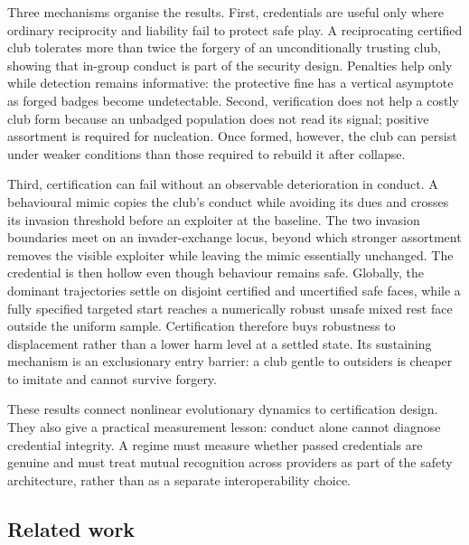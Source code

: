 \documentclass[a4paper,fleqn,longmktitle]{cas-sc}
\theoremstyle{plain}
\theoremstyle{definition}
\begin{document}
Three mechanisms organise the results. First, credentials are useful only
where ordinary reciprocity and liability fail to protect safe play. A
reciprocating certified club tolerates more than twice the forgery of an
unconditionally trusting club, showing that in-group conduct is part of the
security design. Penalties help only while detection remains informative: the
protective fine has a vertical asymptote as forged badges become
undetectable. Second, verification does not help a costly club form because an
unbadged population does not read its signal; positive assortment is required
for nucleation. Once formed, however, the club can persist under weaker
conditions than those required to rebuild it after collapse.

Third, certification can fail without an observable deterioration in conduct.
A behavioural mimic copies the club's conduct while avoiding its dues and
crosses its invasion threshold before an exploiter at the baseline. The two
invasion boundaries meet on an invader-exchange locus, beyond which stronger
assortment removes the visible exploiter while leaving the mimic essentially
unchanged. The credential is then hollow even though behaviour remains safe.
Globally, the dominant trajectories settle on disjoint certified and
uncertified safe faces, while a fully specified targeted start reaches a
numerically robust unsafe mixed rest face outside the uniform sample. Certification
therefore buys robustness to displacement rather than a lower harm level at a
settled state. Its sustaining mechanism is an exclusionary entry barrier: a
club gentle to outsiders is cheaper to imitate and cannot survive forgery.

These results connect nonlinear evolutionary dynamics to certification design.
They also give a practical measurement lesson: conduct alone cannot diagnose
credential integrity. A regime must measure whether passed credentials are
genuine and must treat mutual recognition across providers as part of the
safety architecture, rather than as a separate interoperability choice.
\subsection{Related work}
\label{sec:related}
\end{document}
